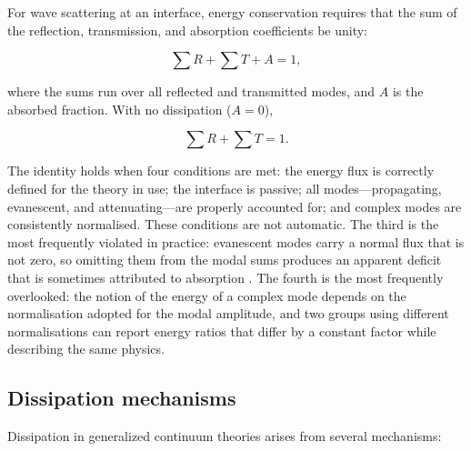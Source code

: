 For wave scattering at an interface, energy conservation requires that the sum of the reflection, transmission, and absorption coefficients be unity:

\begin{equation}
\sum R + \sum T + A = 1,
\label{eq:10.11}
\end{equation}

where the sums run over all reflected and transmitted modes, and $A$ is the absorbed fraction. With no dissipation ($A = 0$),

\begin{equation}
\sum R + \sum T = 1.
\label{eq:10.12}
\end{equation}

The identity holds when four conditions are met: the energy flux is correctly defined for the theory in use; the interface is passive; all modes---propagating, evanescent, and attenuating---are properly accounted for; and complex modes are consistently normalised. These conditions are not automatic. The third is the most frequently violated in practice: evanescent modes carry a normal flux that is not zero, so omitting them from the modal sums produces an apparent deficit that is sometimes attributed to absorption \cite{Gupta2026HeatMap}. The fourth is the most frequently overlooked: the notion of the energy of a complex mode depends on the normalisation adopted for the modal amplitude, and two groups using different normalisations can report energy ratios that differ by a constant factor while describing the same physics.

\subsection{Dissipation mechanisms}
\label{sec:10.6}

Dissipation in generalized continuum theories arises from several mechanisms:

